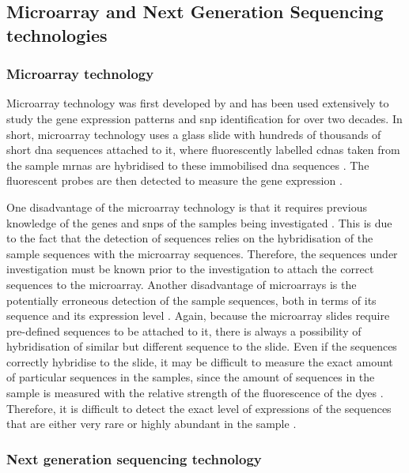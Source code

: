 \subsection{Microarray and Next Generation Sequencing technologies}
\label{sub:microarray_and_next_generation_sequencing_technologies}

\subsubsection{Microarray technology}
\label{ssub:microarray_technology}

Microarray technology was first developed by \citet{Schena1995} and has been used extensively to study the gene expression patterns and \gls{snp} identification for over two decades.
In short, microarray technology uses a glass slide with hundreds of thousands of short \acrshort{dna} sequences attached to it, where fluorescently labelled \glspl{cdna} taken from the sample \glspl{mrna} are hybridised to these immobilised \acrshort{dna} sequences \citep{Schena1995,Schulze2001}.
The fluorescent probes are then detected to measure the gene expression \citep{Schena1995,Schulze2001}.

One disadvantage of the microarray technology is that it requires previous knowledge of the genes and \glspl{snp} of the samples being investigated \citep{Hurd2009}.
This is due to the fact that the detection of sequences relies on the hybridisation of the sample sequences with the microarray sequences.
Therefore, the sequences under investigation must be known prior to the investigation to attach the correct sequences to the microarray.
Another disadvantage of microarrays is the potentially erroneous detection of the sample sequences, both in terms of its sequence and its expression level \citep{Hurd2009}.
Again, because the microarray slides require pre-defined sequences to be attached to it, there is always a possibility of hybridisation of similar but different sequence to the slide.
Even if the sequences correctly hybridise to the slide, it may be difficult to measure the exact amount of particular sequences in the samples, since the amount of sequences in the sample is measured with the relative strength of the fluorescence of the dyes \citep{Hurd2009}.
Therefore, it is difficult to detect the exact level of expressions of the sequences that are either very rare or highly abundant in the sample \citep{Hurd2009}.

\subsubsection{Next generation sequencing technology}
\label{ssub:next_generation_sequencing_technology}

